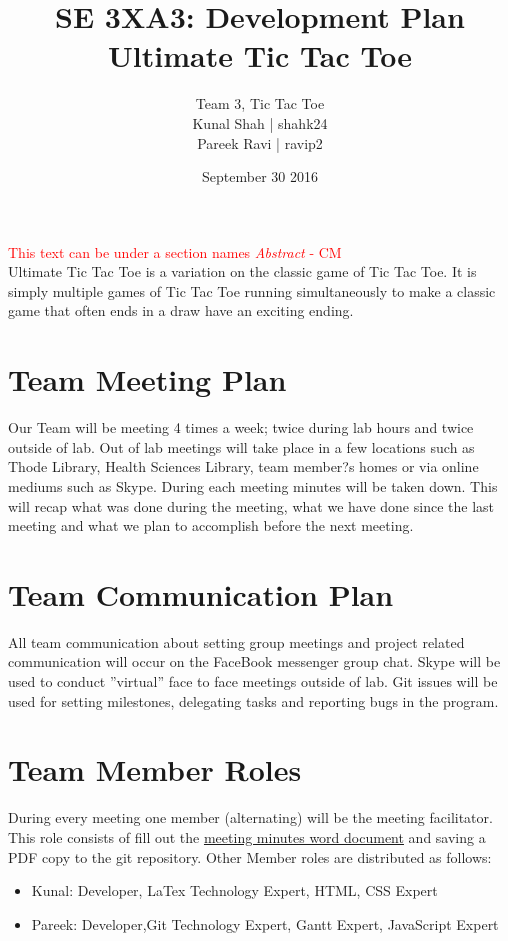 \documentclass{article}
\title{SE 3XA3: Development Plan\\Ultimate Tic Tac Toe}
\author{Team 3, Tic Tac Toe
		\\ Kunal Shah | shahk24
		\\ Pareek Ravi | ravip2
}
\date{September 30 2016}
\begin{document}
\maketitle

\tableofcontents
\newpage

\textcolor{red}{This text can be under a section names \textit{Abstract} - CM} \\
Ultimate Tic Tac Toe is a variation on the classic game of Tic Tac Toe. It is 
simply multiple games of Tic Tac Toe running simultaneously to make a classic 
game that often ends in a draw have an exciting ending.

\section{Team Meeting Plan}
Our Team will be meeting 4 times a week; twice during lab hours and twice 
outside of lab. Out of lab meetings will take place in a few locations such as
Thode Library, Health Sciences Library, team member?s homes or via online 
 mediums such as Skype. During each meeting minutes will be taken down. 
 This will recap what was done during the meeting, what we have done since the 
last meeting and what we plan to accomplish before the next meeting.

\section{Team Communication Plan}
All team communication about setting group
meetings and project related communication will occur on the FaceBook messenger
group chat. Skype will be used to conduct ''virtual'' face to face meetings
outside of lab. Git issues will be used for setting milestones, delegating tasks
and reporting bugs in the program.

\section{Team Member Roles}
During every meeting one member (alternating) will
be the meeting facilitator. This role consists of fill out the \href{run:3XA3
Meeting Summary Template.docx}{meeting minutes word document}
and saving a PDF copy to the git repository. Other Member roles are distributed
as follows:
\begin{itemize}
  \item Kunal: Developer, LaTex Technology Expert, HTML, CSS Expert 
  \item Pareek: Developer,Git Technology Expert, Gantt Expert, JavaScript Expert 

\end{itemize}
\end{document}
